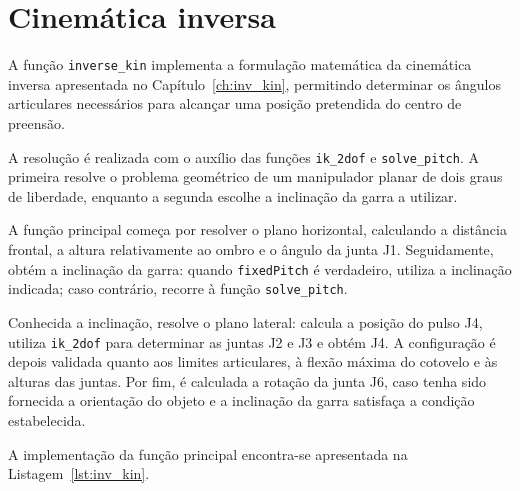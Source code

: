 \section{Cinemática inversa}
\label{sec:cin_inv}

A função \texttt{inverse\_kin} implementa a formulação matemática da cinemática inversa apresentada no Capítulo~\ref{ch:inv_kin}, permitindo determinar os ângulos articulares necessários para alcançar uma posição pretendida do centro de preensão.

A resolução é realizada com o auxílio das funções \texttt{ik\_2dof} e \texttt{solve\_pitch}. A primeira resolve o problema geométrico de um manipulador planar de dois graus de liberdade, enquanto a segunda escolhe a inclinação da garra a utilizar.

A função principal começa por resolver o plano horizontal, calculando a distância frontal, a altura relativamente ao ombro e o ângulo da junta J1. Seguidamente, obtém a inclinação da garra: quando \texttt{fixedPitch} é verdadeiro, utiliza a inclinação indicada; caso contrário, recorre à função \texttt{solve\_pitch}.

Conhecida a inclinação, resolve o plano lateral: calcula a posição do pulso J4, utiliza \texttt{ik\_2dof} para determinar as juntas J2 e J3 e obtém J4. A configuração é depois validada quanto aos limites articulares, à flexão máxima do cotovelo e às alturas das juntas. Por fim, é calculada a rotação da junta J6, caso tenha sido fornecida a orientação do objeto e a inclinação da garra satisfaça a condição estabelecida.

A implementação da função principal encontra-se apresentada na Listagem~\ref{lst:inv_kin}.

